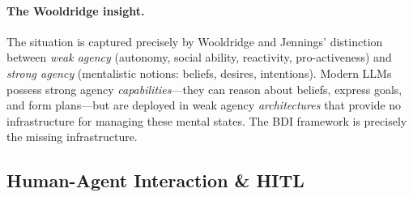 \documentclass{article}
\begin{document}
\paragraph{The Wooldridge insight.}
The situation is captured precisely by Wooldridge and Jennings'
distinction~\citep{wooldridge1995intelligent} between \emph{weak agency} (autonomy,
social ability, reactivity, pro-activeness) and \emph{strong agency} (mentalistic
notions: beliefs, desires, intentions). Modern LLMs possess strong agency
\emph{capabilities}---they can reason about beliefs, express goals, and form
plans---but are deployed in weak agency \emph{architectures} that provide no
infrastructure for managing these mental states. The BDI framework is precisely
the missing infrastructure.


\subsection{Human-Agent Interaction \& HITL}
\label{sec:p-hitl}

%
%
%
%
%
%
%
\end{document}
